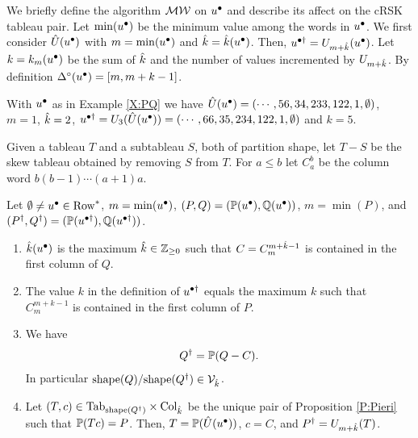 \documentclass{ert-l} %
\begin{document}
We briefly define the algorithm $\mathcal{MW}$ on $u^\bullet$ and describe its affect on the cRSK tableau pair. Let $\min(u^\bullet)$ be the minimum value among the words in $u^\bullet$.
We first consider $\hat{U}(u^\bullet)$ with $m=\min(u^\bullet)$ and $\hat{k}=\hat{k}(u^\bullet)$. Then,
$u^{\bullet\dagger} = U_{m+\hat{k}}(u^\bullet)$. Let $k=k_m(u^\bullet)$ be the sum of $\hat{k}$ and the number of values incremented by $U_{m+\hat{k}}$. By definition $\Delta^{\circ}(u^\bullet)=[m,m+k-1]$.

\begin{example}\label{X:MW} With $u^\bullet$ as in Example \ref{X:PQ} we have $\hat{U}(u^\bullet) = (\dotsm, 56,34, 233, 122,1,\emptyset)$, $m=1$,
	$\hat{k}=2$, $u^{\bullet\dagger} = U_3(\hat{U}(u^\bullet)) = (\dotsm, 66,35, 234, 122,1,\emptyset)$ and $k=5$.
\end{example}

Given a tableau $T$ and a subtableau $S$, both of partition shape, let $T-S$ be the skew tableau obtained by removing $S$ from $T$. For $a\le b$ let $C_a^b$ be the
column word $b (b-1)\dotsm (a+1) a$.

\begin{proposition} \label{P:GL} Let $\emptyset\ne u^\bullet\in\mathrm{Row}^*$,
$m=\min(u^\bullet)$, $(P,Q)=(\mathbb{P}(u^\bullet),\mathbb{Q}(u^\bullet))$, $m=\min(P)$, and
$(P^\dagger,Q^\dagger)=(\mathbb{P}(u^{\bullet\dagger}),\mathbb{Q}(u^{\bullet\dagger}))$.
\begin{enumerate}
\item $\hat{k}(u^\bullet)$ is the maximum $\hat{k}\in\mathbb{Z}_{\ge0}$ such that
$C=C_m^{m+\hat{k}-1}$ is contained in the first column of $Q$.
\item The value $k$ in the definition of $u^{\bullet\dagger}$ equals the maximum $k$ such that
$C_m^{m+k-1}$ is contained in the first column of $P$.
\item We have
\begin{align}
	\label{E:Qlowerdagger}
		Q^\dagger = \mathbb{P}(Q-C).
\end{align}
In particular $\mathrm{shape}(Q)/\mathrm{shape}(Q^\dagger) \in \mathcal{V}_{\hat{k}}$.
\item Let $(T,c)\in \mathrm{Tab}_{\mathrm{shape}(Q^\dagger)} \times \mathrm{Col}_{\hat{k}}$ be the unique pair of Proposition \ref{P:Pieri} such that $\mathbb{P}(Tc)=P$. Then, $T=\mathbb{P}(\hat{U}(u^\bullet))$, $c=C$, and
$P^\dagger = U_{m+\hat{k}}(T)$.
\end{enumerate}
\end{proposition}
\end{document}
